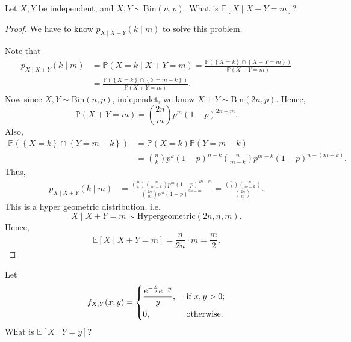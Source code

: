 \begin{eg}
    Let \(X, Y\) be independent, and \(X, Y \sim \mathrm{Bin}(n, p)\). What is \(\mathbb{E} [X \mid X + Y = m]\)?   
\end{eg}
\begin{proof}
    We have to know \(p_{X \mid X+Y}(k \mid m)\) to solve this problem.

    Note that 
    \begin{align*}
        p_{X \mid X + Y} (k \mid m) &= \mathbb{P} (X = k \mid X + Y = m) = \frac{\mathbb{P} \left( \left\{ X = k \right\} \cap \left\{ X + Y = m \right\}   \right) }{\mathbb{P} (X + Y = m)} \\
        &= \frac{\mathbb{P} \left( \left\{ X = k \right\} \cap \left\{ Y = m - k \right\}   \right) }{\mathbb{P} (X + Y = m)}.
    \end{align*} 
    Now since \(X, Y \sim \mathrm{Bin}(n, p) \), independet, we know \(X + Y \sim \mathrm{Bin}(2n, p) \). Hence, 
    \[
        \mathbb{P} (X + Y = m) = \binom{2n}{m} p^m (1 - p)^{2n - m}.
    \]  
    Also,
    \begin{align*}
        \mathbb{P} \left( \left\{ X = k \right\} \cap \left\{ Y = m - k \right\}   \right) &= \mathbb{P} (X = k) \mathbb{P} (Y = m - k) \\
        &= \binom{n}{k} p^k (1 - p)^{n - k} \binom{n}{m - k} p^{m - k} (1 - p)^{n - (m - k)}.
    \end{align*}
    Thus,
    \begin{align*}
        p_{X \mid X + Y} (k \mid m) &= \frac{\binom{n}{k} \binom{n}{m - k} p^m (1 - p)^{2n - m}}{\binom{2n}{m} p^m (1 - p)^{2n - m}} = \frac{\binom{n}{k} \binom{n}{m - k}}{\binom{2n}{m}}.
    \end{align*}
    This is a hyper geometric distribution, i.e. 
    \[
        X \mid X + Y = m \sim \mathrm{Hypergeometric}(2n, n, m). 
    \]
    Hence,
    \[
        \mathbb{E} [X \mid X + Y = m] = \frac{n}{2n} \cdot m = \frac{m}{2}.
    \]
\end{proof}

\begin{eg}
    Let 
    \[
        f_{X, Y} (x, y) = \begin{dcases}
            \frac{e^{- \frac{x}{y}} e^{-y}}{y}, &\text{ if } x, y > 0 ;\\
            0, &\text{ otherwise} .
        \end{dcases}
    \]
    What is \(\mathbb{E} [X \mid Y = y]\)? 
\end{eg}

